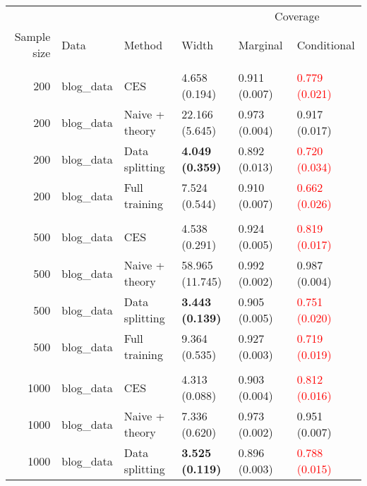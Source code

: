 
\begin{tabular}[t]{rlllll}
\toprule
\multicolumn{4}{c}{ } & \multicolumn{2}{c}{Coverage} \\
\cmidrule(l{3pt}r{3pt}){5-6}
Sample size & Data & Method & Width & Marginal & Conditional\\
\midrule
\addlinespace[0.3em]
\multicolumn{6}{l}{\textbf{200}}\\
\hspace{1em}200 & blog\_data & CES & 4.658 (0.194) & 0.911 (0.007) & \textcolor{red}{0.779 (0.021)}\\
\hspace{1em}200 & blog\_data & Naive + theory & 22.166 (5.645) & 0.973 (0.004) & 0.917 (0.017)\\
\hspace{1em}200 & blog\_data & Data splitting & \textbf{4.049 (0.359)} & 0.892 (0.013) & \textcolor{red}{0.720 (0.034)}\\
\hspace{1em}200 & blog\_data & Full training & 7.524 (0.544) & 0.910 (0.007) & \textcolor{red}{0.662 (0.026)}\\
\addlinespace[0.3em]
\multicolumn{6}{l}{\textbf{500}}\\
\hspace{1em}500 & blog\_data & CES & 4.538 (0.291) & 0.924 (0.005) & \textcolor{red}{0.819 (0.017)}\\
\hspace{1em}500 & blog\_data & Naive + theory & 58.965 (11.745) & 0.992 (0.002) & 0.987 (0.004)\\
\hspace{1em}500 & blog\_data & Data splitting & \textbf{3.443 (0.139)} & 0.905 (0.005) & \textcolor{red}{0.751 (0.020)}\\
\hspace{1em}500 & blog\_data & Full training & 9.364 (0.535) & 0.927 (0.003) & \textcolor{red}{0.719 (0.019)}\\
\addlinespace[0.3em]
\multicolumn{6}{l}{\textbf{1000}}\\
\hspace{1em}1000 & blog\_data & CES & 4.313 (0.088) & 0.903 (0.004) & \textcolor{red}{0.812 (0.016)}\\
\hspace{1em}1000 & blog\_data & Naive + theory & 7.336 (0.620) & 0.973 (0.002) & 0.951 (0.007)\\
\hspace{1em}1000 & blog\_data & Data splitting & \textbf{3.525 (0.119)} & 0.896 (0.003) & \textcolor{red}{0.788 (0.015)}\\

\end{tabular}

